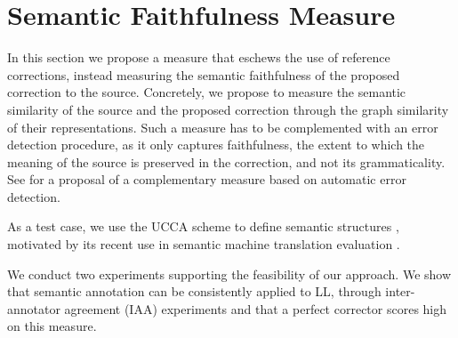 \documentclass[letter,11pt]{article}
\begin{document}
\section{Semantic Faithfulness Measure}\label{sec:Semantics}
%
%
%
%

In this section we propose a measure that eschews the use
of reference corrections, instead measuring the semantic faithfulness of the proposed
correction to the source.
Concretely, we propose to measure the semantic similarity of the source and the proposed correction
through the graph similarity of their representations.
Such a measure has to be complemented with an
error detection procedure, as it only captures faithfulness, the extent to which
the meaning of the source is preserved in the correction,
and not its grammaticality.
See 
for a proposal of a complementary measure based
on automatic error detection.

As a test case, we use the UCCA scheme to define semantic structures \cite{abend2013universal},
motivated by its recent use in semantic machine translation evaluation \cite{birch2016hume}.

We conduct two experiments supporting the feasibility of our approach.
We show that semantic annotation can be consistently applied to LL,
through inter-annotator agreement (IAA) experiments and that a perfect corrector scores high on this measure.
\end{document}
